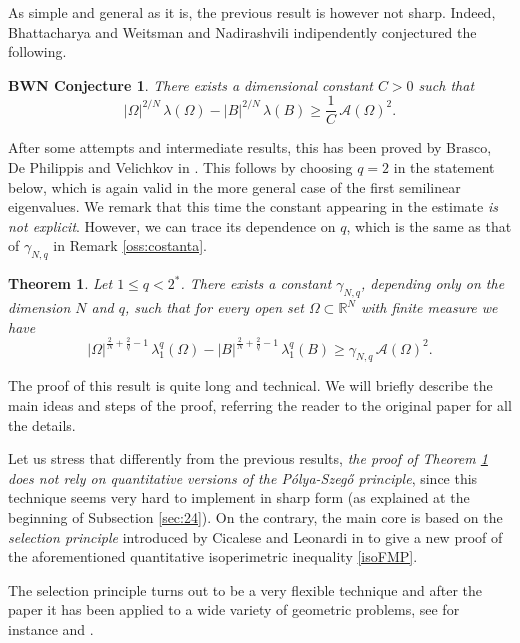 \documentclass{amsart}
\newtheorem{theorem}[lemma]{Theorem}
\newtheorem*{bwn}{BWN Conjecture}
\theoremstyle{definition}
\numberwithin{equation}{section}
\begin{document}
As simple and general as it is, the previous result is however not sharp.
Indeed, Bhattacharya and Weitsman \cite[Section 8]{MR1647193} and Nadirashvili \cite[page 200]{MR1476715} indipendently conjectured the following.  
\begin{bwn}
There exists a dimensional constant $C>0$ such that
\[
|\Omega|^{2/N}\,\lambda(\Omega)- |B|^{2/N}\,\lambda(B)\ge \frac{1}{C}\, \mathcal{A}(\Omega)^2.
\]
\end{bwn}
After some attempts and intermediate results, this has been proved by Brasco, De Philippis and Velichkov in \cite{MR3357184}. This follows by choosing \(q=2\) in the statement below, which is again valid in the more general case of the first semilinear eigenvalues. We remark that this time the constant appearing in the estimate {\it is not explicit}. However, we can trace its dependence on $q$, which is the same as that of $\gamma_{N,q}$ in Remark \ref{oss:costanta}.
\begin{theorem}
\label{thm:fkstability}
Let $1\le q<2^*$. There exists a constant  \(\gamma_{N,q}\), depending only on the dimension \(N\) and $q$, such that for every open set \(\Omega\subset \mathbb{R}^N\) with finite measure we have
\begin{equation}
\label{eq:fkstability}
|\Omega|^{\frac{2}{N}+\frac{2}{q}-1}\,\lambda_{1}^q(\Omega)-|B|^{\frac{2}{N}+\frac{2}{q}-1}\, \lambda_{1}^q(B)\ge \gamma_{N,q}\, \mathcal{A}(\Omega)^2.
\end{equation}
\end{theorem}
The proof of this result is quite long and technical. We will briefly describe the main ideas and steps of the proof, referring the reader to the original paper \cite{MR3357184} for all the details.
\par
Let us stress that differently from the previous results, {\it the proof of Theorem \ref{thm:fkstability} does not rely on quantitative versions of the P\'olya-Szeg\H{o} principle}, since this technique seems very hard to implement in sharp form (as explained at the beginning of Subsection \ref{sec:24}). On the contrary, the main core is based on the \emph{selection principle} introduced by Cicalese and Leonardi in \cite{MR2980529} to give a new proof of the aforementioned quantitative isoperimetric inequality \eqref{isoFMP}.
\par
The  selection principle turns out to be a very flexible technique and after the paper \cite{MR2980529} it has been applied to a wide variety of geometric problems, see for instance \cite{MR3077924, MR3357860} and \cite{MR3189461}. 
\end{document}
